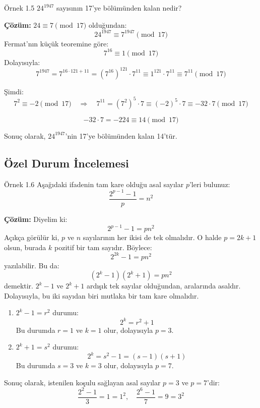 \documentclass[12pt]{article}
\begin{document}
\begin{examplebox}{Örnek 1.5}
$24^{1947}$ sayısının 17'ye bölümünden kalan nedir?

\textbf{Çözüm:}  
$24 \equiv 7 \pmod{17}$ olduğundan:
\[
24^{1947} \equiv 7^{1947} \pmod{17}
\]
Fermat'nın küçük teoremine göre:
\[
7^{16} \equiv 1 \pmod{17}
\]
Dolayısıyla:
\[
7^{1947} = 7^{16 \cdot 121 + 11} = (7^{16})^{121} \cdot 7^{11} \equiv 1^{121} \cdot 7^{11} \equiv 7^{11} \pmod{17}
\]

Şimdi:
\[
7^2 \equiv -2 \pmod{17}
\quad \Rightarrow \quad
7^{11} = (7^2)^5 \cdot 7 \equiv (-2)^5 \cdot 7 \equiv -32 \cdot 7 \pmod{17}
\]

\[
-32 \cdot 7 = -224 \equiv 14 \pmod{17}
\]

Sonuç olarak, $24^{1947}$'nin 17'ye bölümünden kalan 14'tür.
\end{examplebox}

\subsection*{Özel Durum İncelemesi}

\begin{examplebox}{Örnek 1.6}
Aşağıdaki ifadenin tam kare olduğu asal sayılar $p$'leri bulunuz:
\[
\frac{2^{p-1}-1}{p} = n^2
\]

\textbf{Çözüm:}  
Diyelim ki:
\[
2^{p-1} - 1 = p n^2
\]
Açıkça görülür ki, $p$ ve $n$ sayılarının her ikisi de tek olmalıdır. O halde $p = 2k + 1$ olsun, burada $k$ pozitif bir tam sayıdır. Böylece:
\[
2^{2k} - 1 = p n^2
\]
yazılabilir. Bu da:
\[
(2^k - 1)(2^k + 1) = p n^2
\]
demektir. $2^k - 1$ ve $2^k + 1$ ardışık tek sayılar olduğundan, aralarında asaldır. Dolayısıyla, bu iki sayıdan biri mutlaka bir tam kare olmalıdır.

\begin{enumerate}
    \item $2^k - 1 = r^2$ durumu:
    \[
    2^k = r^2 + 1
    \]
    Bu durumda $r = 1$ ve $k = 1$ olur, dolayısıyla $p = 3$.
    
    \item $2^k + 1 = s^2$ durumu:
    \[
    2^k = s^2 - 1 = (s - 1)(s + 1)
    \]
    Bu durumda $s = 3$ ve $k = 3$ olur, dolayısıyla $p = 7$.
\end{enumerate}

Sonuç olarak, istenilen koşulu sağlayan asal sayılar $p = 3$ ve $p = 7$'dir:
\[
\frac{2^{2}-1}{3} = 1 = 1^2, \quad \frac{2^{6}-1}{7} = 9 = 3^2
\]
\end{examplebox}
\end{document}
